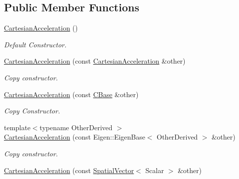\subsection*{Public Member Functions}
\begin{DoxyCompactItemize}
\item 
\hyperlink{classow__core_1_1CartesianAcceleration_a53ba452c7479d2fee4ee0285a50e2bbe}{Cartesian\+Acceleration} ()\hypertarget{classow__core_1_1CartesianAcceleration_a53ba452c7479d2fee4ee0285a50e2bbe}{}\label{classow__core_1_1CartesianAcceleration_a53ba452c7479d2fee4ee0285a50e2bbe}

\begin{DoxyCompactList}\small\item\em Default Constructor. \end{DoxyCompactList}\item 
\hyperlink{classow__core_1_1CartesianAcceleration_add2f84064a20e5395d8396cd3d62297f}{Cartesian\+Acceleration} (const \hyperlink{classow__core_1_1CartesianAcceleration}{Cartesian\+Acceleration} \&other)\hypertarget{classow__core_1_1CartesianAcceleration_add2f84064a20e5395d8396cd3d62297f}{}\label{classow__core_1_1CartesianAcceleration_add2f84064a20e5395d8396cd3d62297f}

\begin{DoxyCompactList}\small\item\em Copy constructor. \end{DoxyCompactList}\item 
\hyperlink{classow__core_1_1CartesianAcceleration_a72c030b9290a6ca9bcf2b0cef8a69676}{Cartesian\+Acceleration} (const \hyperlink{classow__core_1_1CartesianBase}{C\+Base} \&other)\hypertarget{classow__core_1_1CartesianAcceleration_a72c030b9290a6ca9bcf2b0cef8a69676}{}\label{classow__core_1_1CartesianAcceleration_a72c030b9290a6ca9bcf2b0cef8a69676}

\begin{DoxyCompactList}\small\item\em Copy Constructor. \end{DoxyCompactList}\item 
{\footnotesize template$<$typename Other\+Derived $>$ }\\\hyperlink{classow__core_1_1CartesianAcceleration_af7b7922397256f41e7aec8324a4ba319}{Cartesian\+Acceleration} (const Eigen\+::\+Eigen\+Base$<$ Other\+Derived $>$ \&other)
\begin{DoxyCompactList}\small\item\em Copy constructor. \end{DoxyCompactList}\item 
\hyperlink{classow__core_1_1CartesianAcceleration_a1e38e8412bc9943e8a9265bc51e31002}{Cartesian\+Acceleration} (const \hyperlink{classow__core_1_1SpatialVector}{Spatial\+Vector}$<$ Scalar $>$ \&other)\hypertarget{classow__core_1_1CartesianAcceleration_a1e38e8412bc9943e8a9265bc51e31002}{}\label{classow__core_1_1CartesianAcceleration_a1e38e8412bc9943e8a9265bc51e31002}


\end{DoxyCompactItemize}
